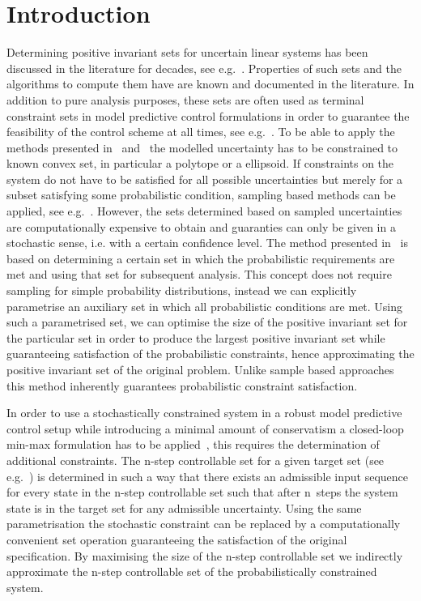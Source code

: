 \documentclass{ifacconf}
\begin{document}
\section{Introduction}
%
%
Determining positive invariant sets for uncertain linear systems has been discussed in the literature for decades, see e.g.~\cite{Kolmanovsky:1995,Kolmanovsky:1998,blanchini:2007}.
%
Properties of such sets and the algorithms to compute them have are known and documented in the literature.
%
In addition to pure analysis purposes, these sets are often used as terminal constraint sets in model predictive control formulations in order to guarantee the feasibility of the control scheme at all times, see e.g.~\cite{Mayne2014}.
%
To be able to apply the methods presented in~\cite{Kolmanovsky:1998} and~\cite{blanchini:2007} the modelled uncertainty has to be constrained to known convex set, in particular a polytope or a ellipsoid.
%
If constraints on the system do not have to be satisfied for all possible uncertainties but merely for a subset satisfying some probabilistic condition, sampling based methods can be applied, see e.g.~\cite{Margellos2014,Zhang2015}.
%
However, the sets determined based on sampled uncertainties are computationally expensive to obtain and guaranties can only be given in a stochastic sense, i.e. with a certain confidence level.
%
The method presented in~\cite{Zhang2015} is based on determining a certain set in which the probabilistic requirements are met and using that set for subsequent analysis.
%
This concept does not require sampling for simple probability distributions, instead we can explicitly parametrise an auxiliary set in which all probabilistic conditions are met.
%
Using such a parametrised set, we can optimise the size of the positive invariant set for the particular set in order to produce the largest positive invariant set while guaranteeing satisfaction of the probabilistic constraints, hence approximating the positive invariant set of the original problem.
%
Unlike sample based approaches this method inherently guarantees probabilistic constraint satisfaction.

In order to use a stochastically constrained system in a robust model predictive control setup while introducing a minimal amount of conservatism a closed-loop min-max formulation has to be applied~\cite{Lee:1997}, this requires the determination of additional constraints.
%
The n-step controllable set for a given target set (see e.g.~\cite{bertsekas71}) is determined in such a way that there exists an admissible input sequence for every state in the n-step controllable set such that after n~steps the system state is in the target set for any admissible uncertainty.
%
Using the same parametrisation the stochastic constraint can be replaced by a computationally convenient set operation guaranteeing the satisfaction of the original specification.
%
By maximising the size of the n-step controllable set we indirectly approximate the n-step controllable set of the probabilistically constrained system.
\end{document}
